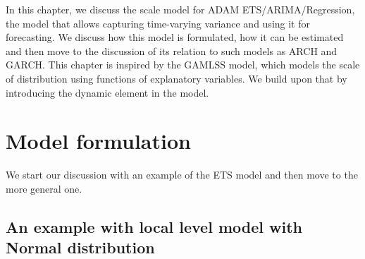 \documentclass[
]{book}
\theoremstyle{definition}
\theoremstyle{definition}
\theoremstyle{definition}
\theoremstyle{definition}
\theoremstyle{remark}
\begin{document}
In this chapter, we discuss the scale model for ADAM ETS/ARIMA/Regression, the model that allows capturing time-varying variance and using it for forecasting. We discuss how this model is formulated, how it can be estimated and then move to the discussion of its relation to such models as ARCH and GARCH. This chapter is inspired by the GAMLSS model, which models the scale of distribution using functions of explanatory variables. We build upon that by introducing the dynamic element in the model.

\hypertarget{ADAMscaleModelFormulation}{%
\section{Model formulation}\label{ADAMscaleModelFormulation}}

We start our discussion with an example of the ETS model and then move to the more general one.

\hypertarget{an-example-with-local-level-model-with-normal-distribution}{%
\subsection{An example with local level model with Normal distribution}\label{an-example-with-local-level-model-with-normal-distribution}}
\end{document}
